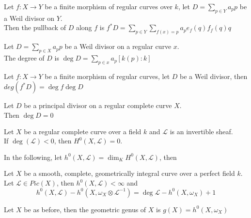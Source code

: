 \documentclass[../main.tex]{subfiles}
\begin{document}
\begin{defn}
	Let $f:X\to Y$ be a finite morphism of regular curves over $k$, let $D= \sum_{p \in Y} a_p p$ be a Weil divisor on $Y$.\\
	Then the pullback of $D$ along $f$ is $f^{\ast}D = \sum_{p \in Y} \sum_{f( x) =p} a_p e_f( q) f_f( q) q $ 
\end{defn}
\begin{defn}
	Let $D= \sum_{p \in X} a_p p	$ be a Weil divisor on a regular curve $x$.\\
	The degree of $D $ is $\deg D = \sum_{p \in x} a_p [ k( p) :k] $ 
\end{defn}
\begin{propo}
Let $f:X\to Y$ be a finite morphism of regular curves, let $D$ be a Weil divisor, then $deg ( f^{\ast }D) = \deg  f \deg D$ 
\end{propo}
\begin{propo}
Let $D$ be a principal divisor on a regular complete curve $X$.\\
Then $\deg D =0$ 
\end{propo}
\begin{lemma}
Let $X$ be a regular complete curve over a field $k$ and $\mathcal{L}$ is an invertible sheaf.\\
If $\deg ( \mathcal{L}) <0$, then $H^{0}( X, \mathcal{L}) =0$.\\
\end{lemma}
In the following, let $h^{0}(  X, \mathcal{L}) = \dim_K H^{0}( X, \mathcal{L}) $, then
\begin{thm}
	Let $X$ be a smooth, complete, geometrically integral curve over a perfect field $k$.\\
	Let $ \mathcal{L}\in Pic( X) $, then $h^{0}( X, \mathcal{L}) < \infty $ and
	\[ 
	h^{0 }( X, \mathcal{L}) - h^{0}( X, \omega_X \otimes \mathcal{L}^{-1}) = \deg \mathcal{L}- h^{0}( X, \omega_X) +1
	\]
\end{thm}
\begin{defn}
	Let $X$ be as before, then the geometric genus of $X$ is $g( X) = h^{0}( X, \omega_X) $ 
\end{defn}
\end{document}
